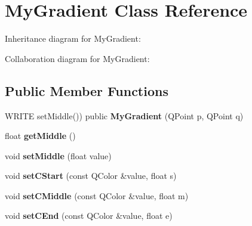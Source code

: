 \hypertarget{class_my_gradient}{\section{My\-Gradient Class Reference}
\label{class_my_gradient}
}


Inheritance diagram for My\-Gradient\-:


Collaboration diagram for My\-Gradient\-:
\subsection*{Public Member Functions}
\begin{DoxyCompactItemize}
\item 
\hypertarget{class_my_gradient_a27908adf6a6414a655fcdeace0953302}{W\-R\-I\-T\-E set\-Middle()) public {\bfseries My\-Gradient} (Q\-Point p, Q\-Point q)}\label{class_my_gradient_a27908adf6a6414a655fcdeace0953302}

\item 
\hypertarget{class_my_gradient_ae4ff6baad026510ca45d7a9f8ffda66a}{float {\bfseries get\-Middle} ()}\label{class_my_gradient_ae4ff6baad026510ca45d7a9f8ffda66a}

\item 
\hypertarget{class_my_gradient_a1656afe4362af1975765577cfae0cca4}{void {\bfseries set\-Middle} (float value)}\label{class_my_gradient_a1656afe4362af1975765577cfae0cca4}

\item 
\hypertarget{class_my_gradient_a2623282273f1ea70ad7fa7ce2a413f66}{void {\bfseries set\-C\-Start} (const Q\-Color \&value, float s)}\label{class_my_gradient_a2623282273f1ea70ad7fa7ce2a413f66}

\item 
\hypertarget{class_my_gradient_a361ab9506f1206105e256f7c0003beff}{void {\bfseries set\-C\-Middle} (const Q\-Color \&value, float m)}\label{class_my_gradient_a361ab9506f1206105e256f7c0003beff}

\item 
\hypertarget{class_my_gradient_aebcbe44cd5b4bcab9c02d02ddf3557c1}{void {\bfseries set\-C\-End} (const Q\-Color \&value, float e)}\label{class_my_gradient_aebcbe44cd5b4bcab9c02d02ddf3557c1}

\end{DoxyCompactItemize}
